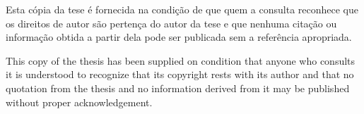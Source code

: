 \thispagestyle{empty}\null\newpage
\thispagestyle{plain}
\newpage
\null
\vfill
Esta cópia da tese é fornecida na condição de que quem a consulta reconhece que os direitos de autor são pertença do autor da tese e que nenhuma citação ou informação obtida a partir dela pode ser publicada sem a referência apropriada.

This copy of the thesis has been supplied on condition that anyone who consults it is understood to recognize that its copyright rests with its author and that no quotation from the thesis and no information derived from it may be published without proper acknowledgement.
